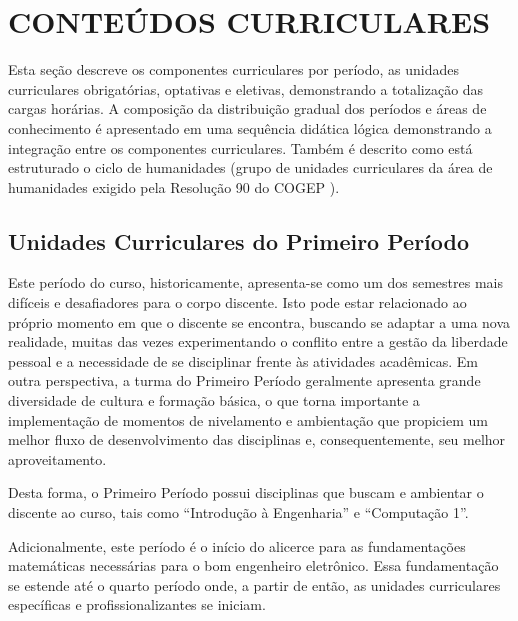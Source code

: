 \section{CONTEÚDOS CURRICULARES}

Esta seção descreve os componentes curriculares por período, as unidades curriculares obrigatórias, optativas e eletivas, demonstrando a totalização das cargas horárias.  A composição da distribuição gradual dos períodos e áreas de conhecimento é apresentado em uma sequência didática lógica demonstrando a integração entre os componentes curriculares. Também é descrito como está estruturado o ciclo de humanidades (grupo de unidades curriculares da área de humanidades exigido pela Resolução 90 do COGEP \cite{cogep90}).

\subsection{Unidades Curriculares do Primeiro Período}

Este período do curso, historicamente, apresenta-se como um dos semestres mais difíceis e desafiadores para o corpo discente. Isto pode estar relacionado ao próprio momento em que o discente se encontra, buscando se adaptar a uma nova realidade, muitas das vezes experimentando o conflito entre a gestão da liberdade pessoal e a necessidade de se disciplinar frente às atividades acadêmicas. Em outra perspectiva, a turma do Primeiro Período geralmente apresenta grande diversidade de cultura e formação básica, o que torna importante a implementação de momentos de nivelamento e ambientação que propiciem um melhor fluxo de desenvolvimento das disciplinas e, consequentemente, seu melhor aproveitamento.

Desta forma, o Primeiro Período possui disciplinas que buscam e ambientar o discente ao curso, tais como ``Introdução à Engenharia'' e ``Computação 1''.

Adicionalmente, este período é o início do alicerce para as fundamentações matemáticas necessárias para o bom engenheiro eletrônico. Essa fundamentação se estende até o quarto período onde, a partir de então, as unidades curriculares específicas e profissionalizantes se iniciam.


